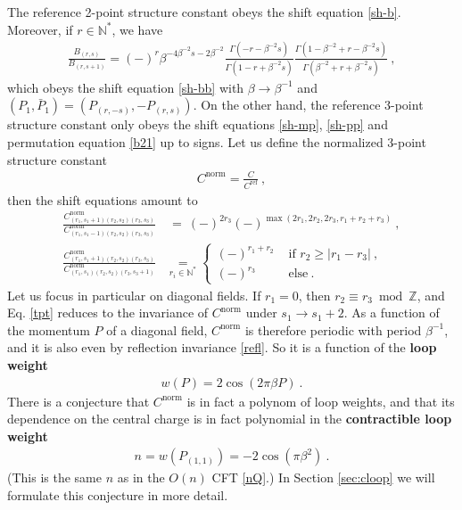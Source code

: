 \documentclass[12pt, a4paper]{article}
\theoremstyle{break}
\begin{document}
 The reference 2-point structure constant obeys the shift equation \eqref{sh-b}. Moreover, if $r\in \mathbb{N}^*$, we have
 \begin{align}
  \frac{B_{(r,s)}}{B_{(r,s+1)}} = (-)^r \beta^{-4\beta^{-2}s-2\beta^{-2}} \frac{\Gamma(-r-\beta^{-2}s)}{\Gamma(1-r+\beta^{-2}s)} \frac{\Gamma(1-\beta^{-2}+r-\beta^{-2}s)}{\Gamma(\beta^{-2}+r+\beta^{-2}s)}\ ,
 \end{align}
which obeys the shift equation \eqref{sh-bb} with $\beta\to\beta^{-1}$ and $(P_1,\bar P_1)=\left(P_{(r,-s)},-P_{(r,s)}\right)$. On the other hand, the reference 3-point structure constant only obeys the shift equations \eqref{sh-mp}, \eqref{sh-pp} and permutation equation \eqref{b21} up to signs. Let us define the normalized 3-point structure constant 
\begin{align}
 C^\text{norm} = \frac{C}{C^\text{ref}}\ , 
\end{align}
then the shift equations amount to \cite{nrj23}
\begin{align}
 \frac{C^\text{norm}_{(r_1,s_1+1)(r_2,s_2)(r_3,s_3)}}{C^\text{norm}_{(r_1,s_1-1)(r_2,s_2)(r_3,s_3)}} &\ =\  (-)^{2r_3}(-)^{\max(2r_1, 2r_2, 2r_3,r_1+r_2+r_3)} \ ,
 \label{tpt}
 \\
 \frac{C^\text{norm}_{(r_1,s_1+1)(r_2,s_2)(r_3,s_3)}}{C^\text{norm}_{(r_1,s_1)(r_2,s_2)(r_3,s_3+1)}} &\underset{r_i\in\mathbb{N}^*}{=} 
 \left\{\begin{array}{ll} (-)^{r_1+r_2} &\text{ if } r_2\geq |r_1-r_3|\ ,
                        \\ (-)^{r_3} &\text{ else}\ .
                       \end{array}\right. 
\label{tppt}
\end{align}
Let us focus in particular on diagonal fields. If $r_1=0$, then $r_2\equiv r_3\bmod\mathbb{Z}$, and Eq. \eqref{tpt} reduces to the invariance of $C^\text{norm}$ under $s_1\to s_1+2$. As a function of the momentum $P$ of a diagonal field, $C^\text{norm}$ is therefore periodic with period $\beta^{-1}$, and it is also even by reflection invariance \eqref{refl}. So it is a function of the \textbf{loop weight}
\begin{align}
 \boxed{w(P) = 2\cos(2\pi\beta P)}\ .
 \label{wP}
\end{align}
There is a conjecture that $C^\text{norm}$ is in fact a polynom of loop weights, and that its dependence on the central charge is in fact polynomial in the \textbf{contractible loop weight}
\begin{align}
 \boxed{n= w\left(P_{(1,1)}\right) = -2\cos(\pi \beta^2)} \ .
 \label{ncb}
\end{align}
(This is the same $n$ as in the $O(n)$ CFT \eqref{nQ}.) In Section \ref{sec:cloop} we will formulate this conjecture in more detail. 
\end{document}
